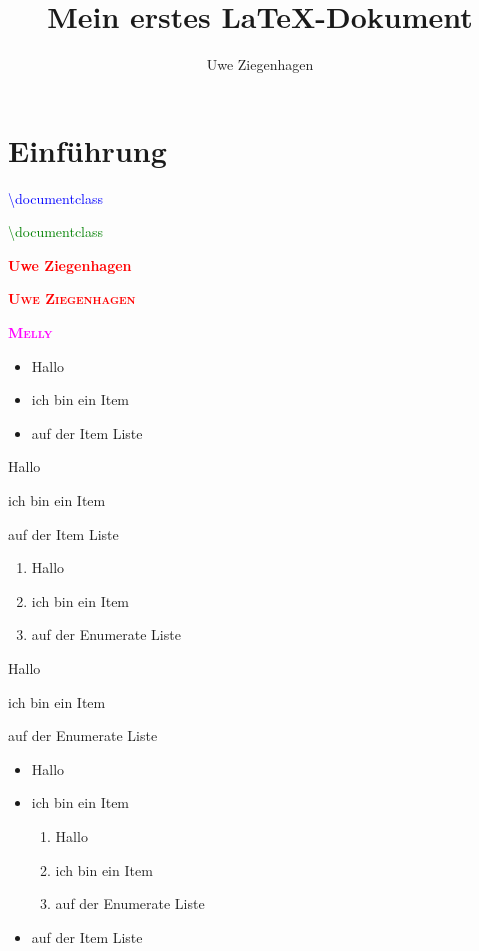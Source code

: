 \documentclass[ngerman,12pt,parskip=half]{scrreprt}
\author{Uwe Ziegenhagen}
\title{Mein erstes \LaTeX-Dokument}
\newcommand{\person}[1]{\textcolor{red}{\textsc{\textbf{#1}}}}
\newcommand{\tier}[1]{\textcolor{magenta}{\textsc{\textbf{#1}}}}
\newcommand{\latexbefehl}[1]{\textcolor{blue}{\ttfamily\textbackslash #1}}
\newcommand{\zweiparams}[2]{\textcolor{#1}{\ttfamily\textbackslash #2}}
\begin{document}
 
\maketitle

\tableofcontents

\chapter{Einführung}

\latexbefehl{documentclass}

\zweiparams{green}{documentclass}


\textcolor{red}{\textbf{Uwe Ziegenhagen}}

\person{Uwe Ziegenhagen}

\tier{Melly}

\begin{itemize}[\(\Rightarrow\)]
\item Hallo
\item ich bin ein Item
\item auf der Item Liste
\end{itemize}

\begin{compactitem}[\(\Rightarrow\)]
\item Hallo
\item ich bin ein Item
\item auf der Item Liste
\end{compactitem}


\begin{enumerate}[i]
\item Hallo
\item ich bin ein Item
\item auf der Enumerate Liste
\end{enumerate}

\begin{compactenum}[i]
\item Hallo
\item ich bin ein Item
\item auf der Enumerate Liste
\end{compactenum}


\begin{itemize}
\item Hallo
\item ich bin ein Item
\begin{enumerate}
\item Hallo
\item ich bin ein Item
\item auf der Enumerate Liste
\end{enumerate}

\item auf der Item Liste
\end{itemize}
\end{document}

